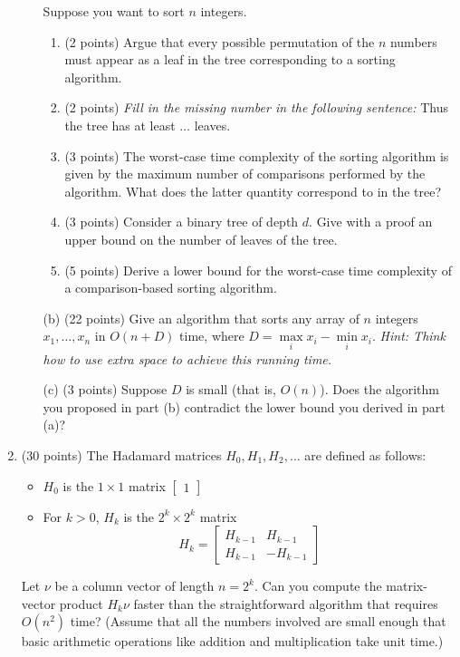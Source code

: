\documentclass[11pt]{article}
\renewcommand\arraystretch{2.4}
\begin{document}
\begin{enumerate}
\begin{enumerate}
\medskip
Suppose you want to sort $n$ integers.
\begin{enumerate}
\item (2 points) Argue that every possible permutation of the $n$ numbers must 
appear as a leaf in the tree corresponding to a sorting algorithm. 
\item (2 points) {\em Fill in the missing number in the following sentence:} 
%
Thus the tree has at least $\ldots$  leaves. 
\item (3 points) The worst-case time complexity of the sorting algorithm 
is given by the maximum number of comparisons performed by the algorithm. 
What does the latter quantity correspond to in the tree?
\item (3 points) Consider a binary tree of depth $d$. Give with a proof 
an upper bound on the number of leaves of the tree. 
\item (5 points) Derive a lower bound for  the worst-case time complexity 
of a comparison-based sorting algorithm.
\end{enumerate}
\item [(b)]  (22 points)  Give an algorithm that sorts any array of 
$n$ integers $x_1, \ldots, x_n$  in $O(n+D)$ time, where 
$D= \max\limits_i x_i - \min\limits_i x_i$.   {\em Hint: Think how 
to use extra space to achieve this running time.}
\item[(c)] (3 points) Suppose $D$ is small (that is, $O(n)$).  
Does the algorithm you proposed in part (b) contradict the 
lower bound you derived in part (a)?
\end{enumerate}

%
\bigskip
\item  (30 points) The Hadamard matrices $H_0, H_1, H_2, \ldots$ 
are defined as follows:
\begin{itemize}
%
\renewcommand\arraystretch{1.0}
%
\item $H_0$ is the $1\times 1$ matrix 
$\begin{bmatrix} 1 \end{bmatrix}$
\item For $k>0$, $H_k$ is the $2^k \times 2^k$ matrix
$$
H_k = \begin{bmatrix}  H_{k-1}  & H_{k-1} \\ H_{k-1}  & -H_{k-1} \end{bmatrix}
$$
\end{itemize}
Let $\nu$ be a column vector of length $n=2^k$. Can you compute 
the matrix-vector product $H_k \nu$ faster than the straightforward
algorithm that requires $O(n^2)$ time? (Assume that all the numbers 
involved are small enough that basic arithmetic operations like addition 
and multiplication  take unit time.)


\end{enumerate}
\end{document}
